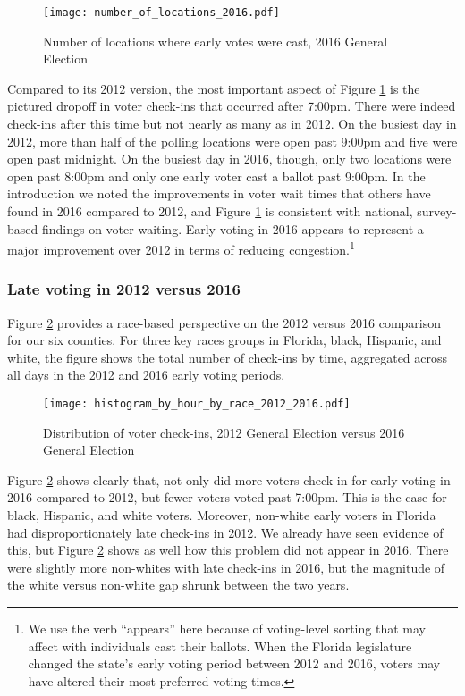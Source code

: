 \documentclass[12pt,titlepage]{article}
\begin{document}
\begin{figure}[!ht]
  \caption{Number of locations where early votes were cast, 2016 General
    Election}
  \label{fig:nrlocs2016}
  \centering
    \centering\texttt{[image: number\_of\_locations\_2016.pdf]}
\end{figure}

Compared to its 2012 version, the most important aspect of Figure
\ref{fig:nrlocs2016} is the pictured dropoff in voter check-ins that
occurred after 7:00pm.  There were indeed check-ins after this time
but not nearly as many as in 2012.  On the busiest day in 2012, more
than half of the polling locations were open past 9:00pm and five were
open past midnight.  On the busiest day in 2016, though, only two
locations were open past 8:00pm and only one early voter cast a ballot
past 9:00pm.  In the introduction we noted the improvements in voter
wait times that others have found in 2016 compared to 2012, and Figure
\ref{fig:nrlocs2016} is consistent with national, survey-based
findings on voter waiting.  Early voting in 2016 appears to represent
a major improvement over 2012 in terms of reducing
congestion.\footnote{We use the verb ``appears'' here because of
  voting-level sorting that may affect with individuals cast their
  ballots.  When the Florida legislature changed the state's early
  voting period between 2012 and 2016, voters may have altered their
  most preferred voting times.}

\subsubsection*{Late voting in 2012 versus 2016}

Figure \ref{fig:race2012and2016} provides a race-based perspective on
the 2012 versus 2016 comparison for our six counties.  For three key
races groups in Florida, black, Hispanic, and white, the figure shows
the total number of check-ins by time, aggregated across all days in
the 2012 and 2016 early voting periods.

\begin{figure}[!ht]
  \caption{Distribution of voter check-ins, 2012 General Election versus 2016 General Election}
  \label{fig:race2012and2016}
  \centering
  \centering\texttt{[image: histogram\_by\_hour\_by\_race\_2012\_2016.pdf]}
\end{figure}

Figure \ref{fig:race2012and2016} shows clearly that, not only did more
voters check-in for early voting in 2016 compared to 2012, but fewer
voters voted past 7:00pm.  This is the case for black, Hispanic, and
white voters. Moreover, non-white early voters in Florida had
disproportionately late check-ins in 2012.  We already have seen
evidence of this, but Figure \ref{fig:race2012and2016} shows as well
how this problem did not appear in 2016.  There were slightly more
non-whites with late check-ins in 2016, but the magnitude of the white
versus non-white gap shrunk between the two years.
\end{document}
